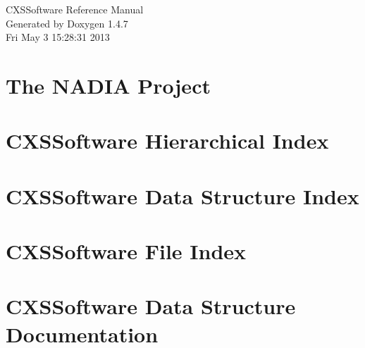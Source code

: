 \documentclass[a4paper]{book}
\begin{document}
\begin{titlepage}
\vspace*{7cm}
\begin{center}
{\Large CXSSoftware Reference Manual}\\
\vspace*{1cm}
{\large Generated by Doxygen 1.4.7}\\
\vspace*{0.5cm}
{\small Fri May 3 15:28:31 2013}\\
\end{center}
\end{titlepage}
\clearemptydoublepage
{}
\tableofcontents
\clearemptydoublepage
{}
\chapter{The NADIA Project }
\label{index}
\chapter{CXSSoftware Hierarchical Index}

\chapter{CXSSoftware Data Structure Index}

\chapter{CXSSoftware File Index}

\chapter{CXSSoftware Data Structure Documentation}



















\end{document}
